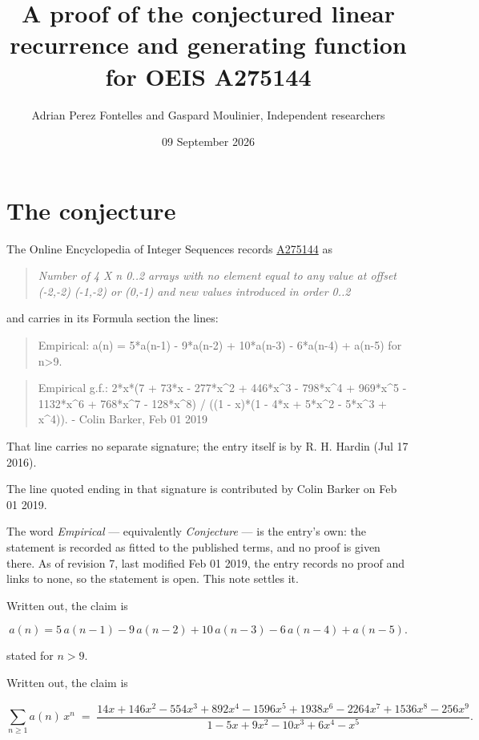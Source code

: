 \documentclass[11pt]{article}
\title{A proof of the conjectured linear recurrence and generating function for OEIS A275144}
\author{Adrian Perez Fontelles and Gaspard Moulinier, Independent researchers}
\date{09 September 2026}
\theoremstyle{definition}
\begin{document}
\maketitle
\section{The conjecture}

The Online Encyclopedia of Integer Sequences records \href{https://oeis.org/A275144}{A275144} as

\begin{quote}\itshape Number of 4 X n 0..2 arrays with no element equal to any value at offset (-2,-2) (-1,-2) or (0,-1) and new values introduced in order 0..2\end{quote}

and carries in its Formula section the lines:

\begin{quote}\ttfamily Empirical: a(n) = 5*a(n-1) - 9*a(n-2) + 10*a(n-3) - 6*a(n-4) + a(n-5) for n>9.\end{quote}

\begin{quote}\ttfamily Empirical g.f.: 2*x*(7 + 73*x - 277*x\textasciicircum{}2 + 446*x\textasciicircum{}3 - 798*x\textasciicircum{}4 + 969*x\textasciicircum{}5 - 1132*x\textasciicircum{}6 + 768*x\textasciicircum{}7 - 128*x\textasciicircum{}8) / ((1 - x)*(1 - 4*x + 5*x\textasciicircum{}2 - 5*x\textasciicircum{}3 + x\textasciicircum{}4)). - Colin Barker, Feb 01 2019\end{quote}

That line carries no separate signature; the entry itself is by R. H. Hardin (Jul 17 2016).

The line quoted ending in that signature is contributed by Colin Barker on Feb 01 2019.

The word {\itshape Empirical} --- equivalently {\itshape Conjecture} --- is the entry's own: the statement is recorded as fitted to the published terms, and no proof is given there. As of revision 7, last modified Feb 01 2019, the entry records no proof and links to none, so the statement is open. This note settles it.

Written out, the claim is

\[a(n) = 5\,a(n-1) - 9\,a(n-2) + 10\,a(n-3) - 6\,a(n-4) + a(n-5).\]

stated for $n > 9$.

Written out, the claim is

\[\sum_{n \ge 1} a(n)\,x^n \;=\; \frac{14x + 146x^{2} - 554x^{3} + 892x^{4} - 1596x^{5} + 1938x^{6} - 2264x^{7} + 1536x^{8} - 256x^{9}}{1 - 5x + 9x^{2} - 10x^{3} + 6x^{4} - x^{5}}.\]
\end{document}
